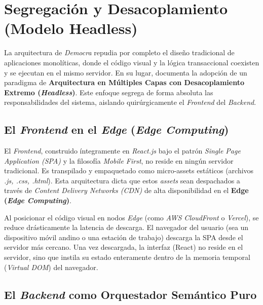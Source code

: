 \section{Segregaci\'on y Desacoplamiento (Modelo Headless)}

La arquitectura de \textit{Democra} repudia por completo el dise\~no tradicional de aplicaciones monol\'iticas, donde el c\'odigo visual y la l\'ogica transaccional coexisten y se ejecutan en el mismo servidor. En su lugar, documenta la adopci\'on de un paradigma de \textbf{Arquitectura en M\'ultiples Capas con Desacoplamiento Extremo (\textit{Headless})}. Este enfoque segrega de forma absoluta las responsabilidades del sistema, aislando quir\'urgicamente el \textit{Frontend} del \textit{Backend}.

\subsection{El \textit{Frontend} en el \textit{Edge} (\textit{Edge Computing})}

El \textit{Frontend}, construido \'integramente en \textit{React.js} bajo el patr\'on \textit{Single Page Application (SPA)} y la filosof\'ia \textit{Mobile First}, no reside en ning\'un servidor tradicional. Es transpilado y empaquetado como micro-assets est\'aticos (archivos \textit{.js, .css, .html}). Esta arquitectura dicta que estos \textit{assets} sean despachados a trav\'es de \textit{Content Delivery Networks (CDN)} de alta disponibilidad en el \textbf{Edge (\textit{Edge Computing})}.

Al posicionar el c\'odigo visual en nodos \textit{Edge} (como \textit{AWS CloudFront} o \textit{Vercel}), se reduce dr\'asticamente la latencia de descarga. El navegador del usuario (sea un dispositivo m\'ovil andino o una estaci\'on de trabajo) descarga la SPA desde el servidor m\'as cercano. Una vez descargada, la interfaz (React) no reside en el servidor, sino que instila su estado enteramente dentro de la memoria temporal (\textit{Virtual DOM}) del navegador.

\subsection{El \textit{Backend} como Orquestador Sem\'antico Puro}

